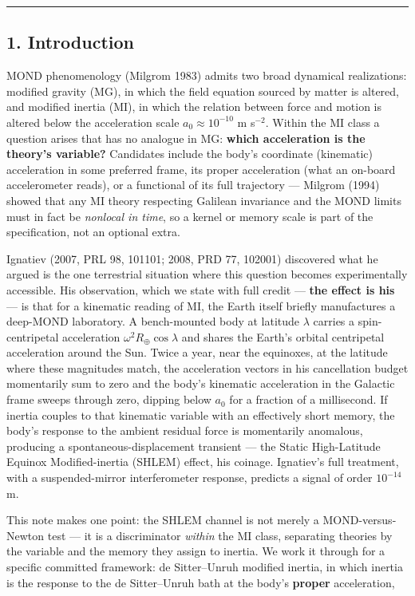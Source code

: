 \documentclass[
]{article}
\begin{document}
\begin{center}\rule{0.5\linewidth}{0.5pt}\end{center}

\subsection{1. Introduction}\label{introduction}

MOND phenomenology (Milgrom 1983) admits two broad dynamical
realizations: modified gravity (MG), in which the field equation sourced
by matter is altered, and modified inertia (MI), in which the relation
between force and motion is altered below the acceleration scale
\(a_0 \approx 10^{-10}\) m s\(^{-2}\). Within the MI class a question
arises that has no analogue in MG: \textbf{which acceleration is the
theory's variable?} Candidates include the body's coordinate (kinematic)
acceleration in some preferred frame, its proper acceleration (what an
on-board accelerometer reads), or a functional of its full trajectory
--- Milgrom (1994) showed that any MI theory respecting Galilean
invariance and the MOND limits must in fact be \emph{nonlocal in time},
so a kernel or memory scale is part of the specification, not an
optional extra.

Ignatiev (2007, PRL 98, 101101; 2008, PRD 77, 102001) discovered what he
argued is the one terrestrial situation where this question becomes
experimentally accessible. His observation, which we state with full
credit --- \textbf{the effect is his} --- is that for a kinematic
reading of MI, the Earth itself briefly manufactures a deep-MOND
laboratory. A bench-mounted body at latitude \(\lambda\) carries a
spin-centripetal acceleration \(\omega^2 R_\oplus \cos\lambda\) and
shares the Earth's orbital centripetal acceleration around the Sun.
Twice a year, near the equinoxes, at the latitude where these magnitudes
match, the acceleration vectors in his cancellation budget momentarily
sum to zero and the body's kinematic acceleration in the Galactic frame
sweeps through zero, dipping below \(a_0\) for a fraction of a
millisecond. If inertia couples to that kinematic variable with an
effectively short memory, the body's response to the ambient residual
force is momentarily anomalous, producing a spontaneous-displacement
transient --- the Static High-Latitude Equinox Modified-inertia (SHLEM)
effect, his coinage. Ignatiev's full treatment, with a suspended-mirror
interferometer response, predicts a signal of order \(10^{-14}\) m.

This note makes one point: the SHLEM channel is not merely a
MOND-versus-Newton test --- it is a discriminator \emph{within} the MI
class, separating theories by the variable and the memory they assign to
inertia. We work it through for a specific committed framework: de
Sitter--Unruh modified inertia, in which inertia is the response to the
de Sitter--Unruh bath at the body's \textbf{proper} acceleration,
\end{document}
